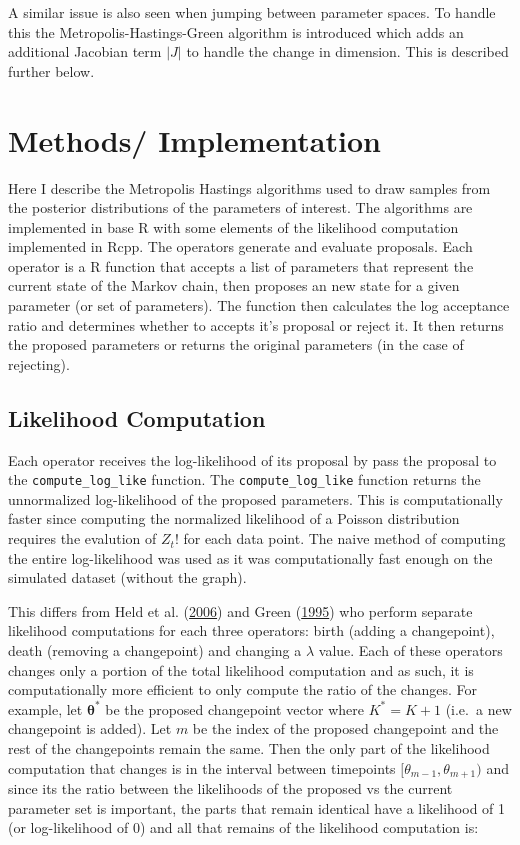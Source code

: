 \documentclass[]{article}
\numberwithin{equation}{section}
\begin{document}
A similar issue is also seen when jumping between parameter spaces. To
handle this the Metropolis-Hastings-Green algorithm is introduced which
adds an additional Jacobian term \(|J|\) to handle the change in
dimension. This is described further below.

\hypertarget{methods-implementation}{%
\section{Methods/ Implementation}\label{methods-implementation}}

Here I describe the Metropolis Hastings algorithms used to draw samples
from the posterior distributions of the parameters of interest. The
algorithms are implemented in base R with some elements of the
likelihood computation implemented in Rcpp. The operators generate and
evaluate proposals. Each operator is a R function that accepts a list of
parameters that represent the current state of the Markov chain, then
proposes an new state for a given parameter (or set of parameters). The
function then calculates the log acceptance ratio and determines whether
to accepts it's proposal or reject it. It then returns the proposed
parameters or returns the original parameters (in the case of
rejecting).

\hypertarget{likelihood-computation}{%
\subsection{Likelihood Computation}\label{likelihood-computation}}

Each operator receives the log-likelihood of its proposal by pass the
proposal to the \texttt{compute\_log\_like} function. The
\texttt{compute\_log\_like} function returns the unnormalized
log-likelihood of the proposed parameters. This is computationally
faster since computing the normalized likelihood of a Poisson
distribution requires the evalution of \(Z_{t}!\) for each data point.
The naive method of computing the entire log-likelihood was used as it
was computationally fast enough on the simulated dataset (without the
graph).

This differs from Held et al.
(\protect\hyperlink{ref-held_two-component_2006}{2006}) and Green
(\protect\hyperlink{ref-green_reversible_1995}{1995}) who perform
separate likelihood computations for each three operators: birth (adding
a changepoint), death (removing a changepoint) and changing a
\(\lambda\) value. Each of these operators changes only a portion of the
total likelihood computation and as such, it is computationally more
efficient to only compute the ratio of the changes. For example, let
\(\boldsymbol{\theta^*}\) be the proposed changepoint vector where
\(K^* = K + 1\) (i.e.~a new changepoint is added). Let \(m\) be the
index of the proposed changepoint and the rest of the changepoints
remain the same. Then the only part of the likelihood computation that
changes is in the interval between timepoints
\([\theta_{m-1}, \theta_{m+1})\) and since its the ratio between the
likelihoods of the proposed vs the current parameter set is important,
the parts that remain identical have a likelihood of 1 (or
log-likelihood of 0) and all that remains of the likelihood computation
is:
\end{document}
